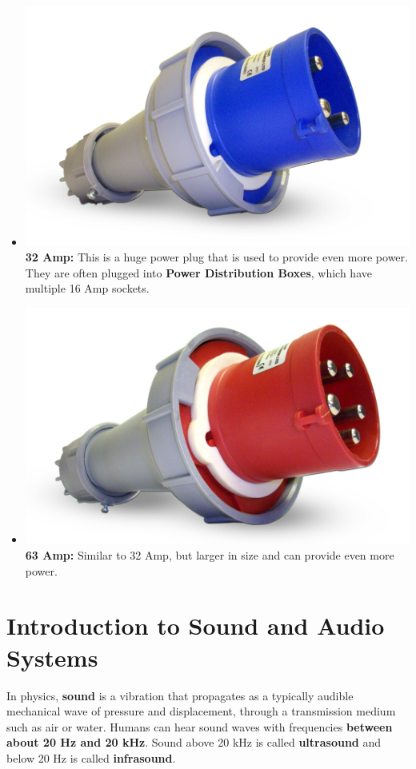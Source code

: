 \documentclass[14pt]{article} %
\begin{document}
\begin{itemize}
\item \includegraphics[scale=0.16]{32amp.jpg}\textbf{32 Amp:} This is a huge power plug that is used to provide even more power. They are often plugged into \textbf{Power Distribution Boxes}, which have multiple 16 Amp sockets. 

\item \includegraphics[scale=0.16]{63amp.jpg}\textbf{63 Amp:} Similar to 32 Amp, but larger in size and can provide even more power.

\end{itemize}


\section{Introduction to Sound and Audio Systems}
\label{intro-sound}
In physics, \textbf{sound} is a vibration that propagates as a typically audible mechanical wave of pressure and displacement, through a transmission medium such as air or water. Humans can hear sound waves with frequencies \textbf{between about 20 Hz and 20 kHz}. Sound above 20 kHz is called \textbf{ultrasound} and below 20 Hz is called \textbf{infrasound}.
\end{document}
